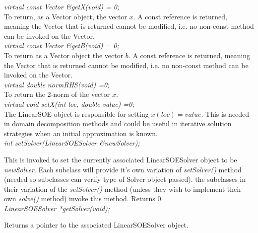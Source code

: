 {\em virtual const Vector \&getX(void) = 0;} \\
To return, as a Vector object, the vector $x$. A const reference is
returned, meaning the Vector that is returned cannot be modified, i.e.
no non-const method can be invoked on the Vector. \\

{\em virtual const Vector \&getB(void) = 0;} \\
To return as a Vector object the vector $b$. A const reference is
returned, meaning the Vector that is returned cannot be modified, i.e.
no non-const method can be invoked on the Vector. \\


{\em virtual double normRHS(void) =0;} \\
To return the 2-norm of the vector $x$. \\

{\em virtual void setX(int loc, double value) =0;}\\
The LinearSOE object is responsible for setting $x(loc) = value$. This
is needed in domain decomposition methods and could be useful in
iterative solution strategies when an initial approximation is known.\\


{\em int setSolver(LinearSOESolver \&newSolver);}

This is invoked to set the currently associated LinearSOESolver object to 
be {\em newSolver}. Each subclass will provide it's own variation of {\em
setSolver()} method (needed so subclasses can verify type of Solver
object passed). the subclasses in their variation of the {\em setSolver()}
method (unless they wish to implement their own {\em solve()}
method) invoke this method. Returns $0$.  \\

{\em     LinearSOESolver *getSolver(void);}

Returns a pointer to the associated LinearSOESolver object.





